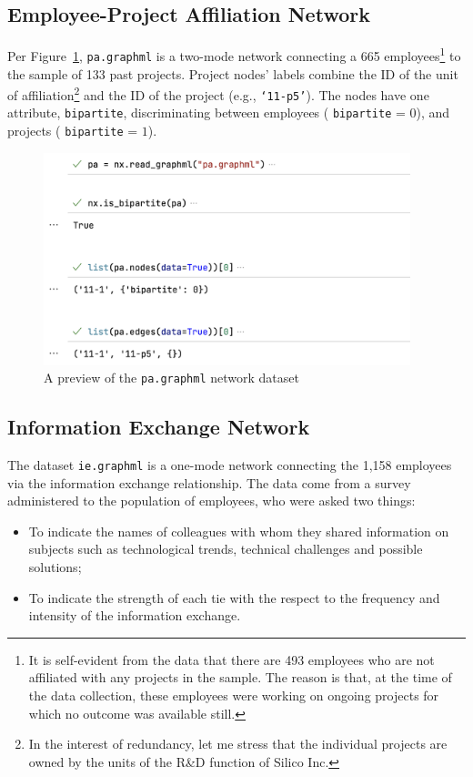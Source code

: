\documentclass[11pt]{article}
\begin{document}
\subsection{Employee-Project Affiliation Network}

Per Figure~\ref{fig:pa}, \texttt{pa.graphml} is a two-mode network connecting a
665 employees\footnote{It is self-evident from the data that there are 493
employees who are not affiliated with any projects in the sample. The reason is
that, at the time of the data collection, these employees were working on 
ongoing projects for which no outcome was available still.} to the sample of 133
past projects. Project nodes' labels combine the ID of the unit of
affiliation\footnote{In the interest of redundancy, let me stress that the
individual projects are owned by the units of the R\&D function of Silico Inc.}
and the ID of the project (e.g., \texttt{`11-p5'}).  The nodes have one
attribute, \texttt{bipartite}, discriminating between employees (
\texttt{bipartite} = $0$), and projects ( \texttt{bipartite} = $1$).

\begin{figure}
	\centering
	\includegraphics[width=0.95\textwidth]{pa.png}
	\caption{A preview of the 
	 \texttt{pa.graphml} network dataset}
	\label{fig:pa}
\end{figure}

\subsection{Information Exchange Network}

The dataset \texttt{ie.graphml} is a one-mode network connecting 
the 1,158 employees via the information exchange relationship. The data 
come from a survey administered to the population of employees, who were 
asked two things:
\begin{itemize}
	\item To indicate the names of colleagues with whom they shared 
	information on subjects such as technological trends, technical challenges 
	and possible solutions;
	\item To indicate the strength of each tie with the respect to the frequency 
	and intensity of the information exchange.
\end{itemize}
\end{document}
